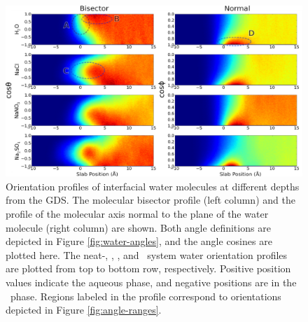 \begin{figure}[h!]
\begin{center}
	\includegraphics[scale=1.0]{images/h2o-2dhistograms.png}
	\caption{Orientation profiles of interfacial water molecules at different depths from the GDS. The molecular bisector profile (left column) and the profile of the molecular axis normal to the plane of the water molecule (right column) are shown. Both angle definitions are depicted in Figure \ref{fig:water-angles}, and the angle cosines are plotted here. The neat-\ctcwat, \nacl, \sodnit, and \sodsul~system water orientation profiles are plotted from top to bottom row, respectively. Positive position values indicate the aqueous phase, and negative positions are in the \ctc~phase. Regions labeled in the profile correspond to orientations depicted in Figure \ref{fig:angle-ranges}.}
	\label{fig:2dhisto}
\end{center}
\end{figure}


